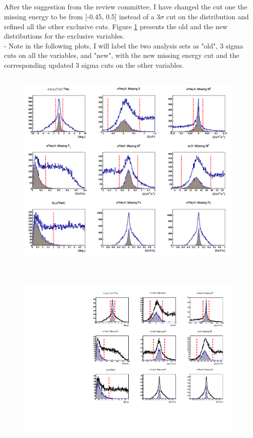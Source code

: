 \subsection*{}
After the suggestion from the review committee, I have changed the cut one the 
missing energy to be from [-0.45, 0.5] instead of a 3$\sigma$ cut on the 
distribution and refined all the other exclusive cuts. Figure 
\ref{fig:exc_cuts} presents the old and the new distributions for the exclusive 
variables.\\

- Note in the following plots, I will label the two analysis sets as "old", 3 
sigma cuts on all the variables, and "new", with the new missing energy cut and 
the corresponding updated 3 sigma cuts on the other variables.



\begin{figure}[h!]
\centering
\includegraphics[height=10.0cm]{old_plots/all_coh_exc_cuts.png}
\includegraphics[height=10.0cm]{new_plots/all_coh_exc_cuts.pdf}
\caption{ }
\label{fig:exc_cuts}
\end{figure}



